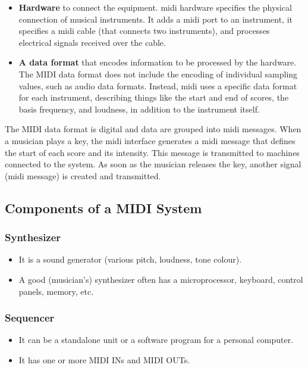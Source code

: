 \begin{itemize}
	\item \textbf{Hardware} to connect the equipment. \gls{midi} hardware specifies the physical connection of musical instruments. It adds a \gls{midi} port to an instrument, it specifies a \gls{midi} cable (that connects two instruments), and processes electrical signals received over the cable.
	
	\item \textbf{A data format} that encodes information to be processed by the hardware. The MIDI data format does not include the encoding of individual sampling values, such as audio data formats. Instead, \gls{midi} uses a specific data format for each instrument, describing things like the start and end of scores, the basis frequency, and loudness, in addition to the instrument itself.
	
\end{itemize}
The MIDI data format is digital and data are grouped into \gls{midi} messages. When
a musician plays a key, the \gls{midi} interface generates a \gls{midi} message that defines the start of each score and its intensity. This message is transmitted to machines connected to the system. As soon as the musician releases the key, another signal (\gls{midi} message) is created and transmitted.

\subsection[Components]{Components of a MIDI System}

\subsubsection*{Synthesizer}
	\begin{itemize}
	\item It is a sound generator (various pitch, loudness, tone colour).
	\item A good (musician's) synthesizer often has a microprocessor, keyboard, control panels, memory, etc. 
\end{itemize}

\subsubsection*{Sequencer}
	\begin{itemize}
		\item It can be a standalone unit or a software program for a personal computer.
		\item It has one or more MIDI INs and MIDI OUTs. 
	\end{itemize}

